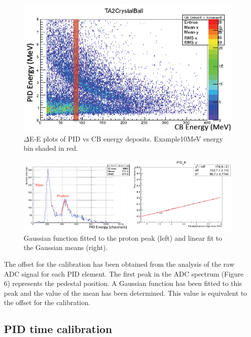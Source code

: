 \begin{figure}[H]
\begin{center}
\includegraphics[scale=0.6]{bananacali.png}
\caption{$\Delta$E-E plots of PID vs CB energy deposits. Example10MeV energy bin shaded in red.}
\label{bananacali}
\end{center}
\end{figure}

\begin{figure}[H]
\begin{center}
\includegraphics[scale=0.5]{bananagaus.png}
\caption{Gaussian function fitted to the proton peak (left) and linear fit to the Gaussian means (right).}
\label{bananagaus}
\end{center}
\end{figure}

\indent The offset for the calibration has been obtained from the analysis of the raw ADC signal for each PID element. The first peak in the ADC spectrum (Figure 6) represents the pedestal position. A Gaussian function has been fitted to this peak and the value of the mean has been determined. This value is equivalent to the offset for the calibration.

\subsection{PID time calibration}

